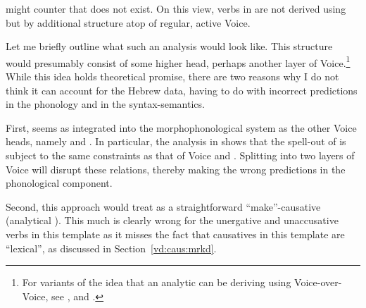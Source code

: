 \begin{exe}
\begin{xlist}
\begin{xlist}
\begin{exe}
\begin{exe}
\begin{xlist}
\begin{exe}
\begin{xlist}
\begin{exe}
\begin{xlist}
\begin{xlist}
\begin{exe}
\begin{xlist}
\begin{exe}
\begin{xlist}
\begin{exe}
\begin{xlist}
\begin{exe}
\begin{exe}
\begin{exe}
\begin{xlist}
\begin{exe}
\begin{exe}
\begin{xlist}
\begin{xlist}
\begin{exe}
\begin{xlist}
\begin{exe}
\begin{exe}
\begin{xlist}
\begin{exe}
\begin{exe}
\begin{xlist}
\begin{exe}
\begin{xlist}
\begin{exe}
\begin{xlist}
\begin{exe}
\begin{xlist}
\begin{exe}
\begin{exe}
\begin{xlist}
\begin{exe}
\begin{exe}
\begin{xlist}
\begin{xlist}
\begin{exe}
\begin{xlist}
\begin{xlist}
\begin{exe}
\begin{xlist}
\begin{exe}
\begin{xlist}
\begin{exe}
\begin{xlist}
\begin{exe}
\begin{xlist}
\begin{exe}
\begin{exe}
\begin{exe}
\begin{exe}
\begin{xlist}
\begin{exe}
\begin{exe}
\begin{xlist}
\begin{xlist}
\begin{exe}
\begin{exe}
\begin{xlist}
\begin{exe}
\begin{xlist}
might counter that {\vd} does not exist. On this view, verbs in {\thif} are not derived using {\vd} but by additional structure atop of regular, active Voice.

Let me briefly outline what such an analysis would look like. This structure would presumably consist of some higher  head, perhaps another layer of Voice.\footnote{For variants of the idea that an analytic  can be deriving using Voice-over-Voice, see \cite{tubinoblanco11}, \cite{harley13lingua,harley17oup} and \cite{nie20}.} While this idea holds theoretical promise, there are two reasons why I do not think it can account for the Hebrew data, having to do with incorrect predictions in the phonology and in the syntax-semantics.

First, {\vd} seems as integrated into the morphophonological system as the other Voice heads, namely  and {\vz}. In particular, the analysis in \cite{kastner18nllt} shows that the spell-out of {\vd} is subject to the same  constraints as that of Voice and {\vz}. Splitting {\vd} into two layers of Voice will disrupt these  relations, thereby making the wrong predictions in the phonological component.

Second, this approach would treat {\thif} as a straightforward ``make''-caus\-a\-tive (analytical ). This much is clearly wrong for the unergative and unaccusative verbs in this template as it misses the fact that causatives in this template are ``lexical'', as discussed in Section~\ref{vd:caus:mrkd}. 


\end{xlist}
\end{exe}
\end{xlist}
\end{exe}
\end{exe}
\end{xlist}
\end{xlist}
\end{exe}
\end{exe}
\end{xlist}
\end{exe}
\end{exe}
\end{exe}
\end{exe}
\end{xlist}
\end{exe}
\end{xlist}
\end{exe}
\end{xlist}
\end{exe}
\end{xlist}
\end{exe}
\end{xlist}
\end{xlist}
\end{exe}
\end{xlist}
\end{xlist}
\end{exe}
\end{exe}
\end{xlist}
\end{exe}
\end{exe}
\end{xlist}
\end{exe}
\end{xlist}
\end{exe}
\end{xlist}
\end{exe}
\end{xlist}
\end{exe}
\end{exe}
\end{xlist}
\end{exe}
\end{exe}
\end{xlist}
\end{exe}
\end{xlist}
\end{xlist}
\end{exe}
\end{exe}
\end{xlist}
\end{exe}
\end{exe}
\end{exe}
\end{xlist}
\end{exe}
\end{xlist}
\end{exe}
\end{xlist}
\end{exe}
\end{xlist}
\end{xlist}
\end{exe}
\end{xlist}
\end{exe}
\end{xlist}
\end{exe}
\end{exe}
\end{xlist}
\end{xlist}
\end{exe}
